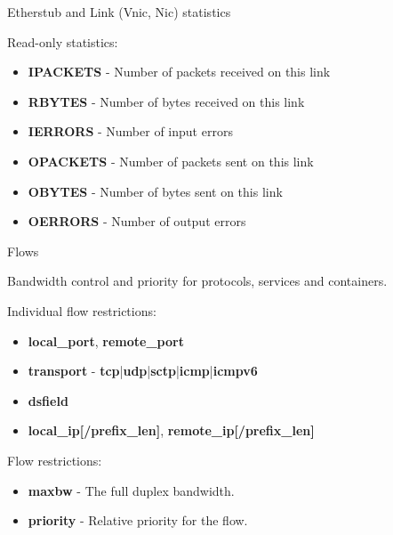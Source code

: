 \documentclass{beamer}
\begin{document}
		\begin{frame}{Etherstub and Link (Vnic, Nic) statistics }

			Read-only statistics:
			
			\begin{itemize}

				\item \textbf{IPACKETS} - Number of packets received on this link
				\item \textbf{RBYTES} - Number of bytes received on this link
				\item \textbf{IERRORS} - Number of input errors
				\item \textbf{OPACKETS} - Number of packets sent on this link
				\item \textbf{OBYTES} - Number of bytes sent on this link
				\item \textbf{OERRORS} - Number of output errors
			
			\end{itemize}

		\end{frame}


		\begin{frame}{Flows}

			Bandwidth control and priority for protocols, services and containers.

			\medskip

			Individual flow restrictions:

			\begin{itemize}
				\item \textbf{local\_port}, \textbf{remote\_port}
				\item \textbf{transport} - \textbf{tcp}|\textbf{udp}|\textbf{sctp}|\textbf{icmp}|\textbf{icmpv6}
				\item \textbf{dsfield}
				\item \textbf{local\_ip[/prefix\_len]}, \textbf{remote\_ip[/prefix\_len]}
			\end{itemize}

			\medskip

			Flow restrictions:

			\begin{itemize}
				\item \textbf{maxbw} - The full duplex bandwidth.
				\item \textbf{priority} - Relative priority for the flow.
			\end{itemize}

		\end{frame}
\end{document}
